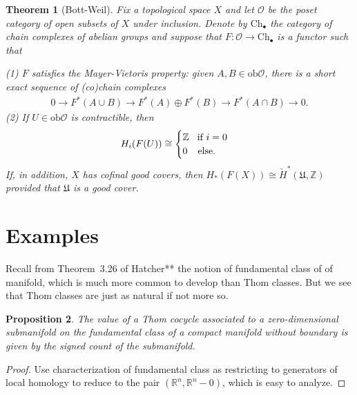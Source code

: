 \documentclass{amsart}          %
\newcommand{\Z}{{\mathbb{Z}}}
\newtheorem{theorem}{Theorem}
\newtheorem{proposition}[theorem]{Proposition}
\newcommand{\R}{\mathbb R}
\newcommand{\Ch}{\mathrm{Ch}_\bullet}
\begin{document}
\begin{theorem}[Bott-Weil]
	Fix a topological space $X$ and let $\mathscr{O}$ be the poset category of open subsets of $X$ under inclusion. Denote by $\Ch$ the category of chain complexes of abelian groups and suppose that $F:\mathscr{O}\to\Ch$ is a functor such that\begin{flushleft}
		\textup{(1)} $F$ satisfies the Mayer-Vietoris property: given $A,B\in\mathrm{ob}\mathscr{O}$, there is a short exact sequence of (co)chain complexes\begin{align*}
		0\to F^*(A\cup B)\to F^*(A)\oplus F^*(B)\to F^*(A\cap B)\to 0.
		\end{align*}
		\textup{(2)} If $U\in\mathrm{ob}\mathscr{O}$ is contractible, then\begin{align*}
		H_i(F(U))\cong\begin{cases}
		\Z\textup{\hspace{0.3cm}if $i=0$}\\
		0\textup{\hspace{0.375cm}else.}
		\end{cases}
		\end{align*}If, in addition, $X$ has cofinal good covers, then $H_*(F(X))\cong\check{H}^*(\mathfrak{U},\Z)$ provided that $\mathfrak{U}$ is a good cover.
	\end{flushleft}
\end{theorem}

\section{Examples}

Recall from Theorem~3.26 of Hatcher** the notion of fundamental class of of manifold, which  is much more common to 
develop than Thom classes.  
But we see that Thom classes are just as natural if not more so.


\begin{proposition}\label{top_cohomology}
The value of a Thom cocycle associated to a zero-dimensional submanifold on the fundamental class of a compact manifold without
boundary  is given by 
the signed count of the submanifold.
\end{proposition}

\begin{proof}
Use characterization of fundamental class as restricting to generators of local homology to reduce to the pair $(\R^n, \R^n - 0)$,
which is easy to analyze.
\end{proof}
\end{document}
